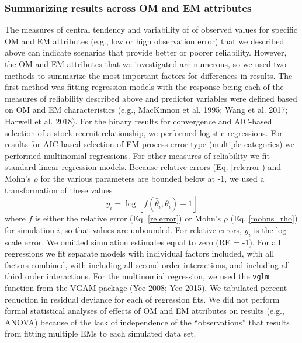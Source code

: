 \documentclass[
  12pt,
]{article}
\begin{document}
\subsubsection*{Summarizing results across OM and EM
attributes}\label{summarizing-results-across-om-and-em-attributes}

The measures of central tendency and variability of of observed values
for specific OM and EM attributes (e.g., low or high observation error)
that we described above can indicate scenarios that provide better or
poorer reliability. However, the OM and EM attributes that we
investigated are numerous, so we used two methods to summarize the most
important factors for differences in results. The first method was
fitting regression models with the response being each of the measures
of reliability described above and predictor variables were defined
based on OM and EM characteristics (e.g., MacKinnon et al. 1995; Wang et
al. 2017; Harwell et al. 2018). For the binary results for convergence
and AIC-based selection of a stock-recruit relationship, we performed
logistic regressions. For results for AIC-based selection of EM process
error type (multiple categories) we performed multinomial regressions.
For other measures of reliability we fit standard linear regression
models. Because relative errors (Eq. \ref{relerror}) and Mohn's \(\rho\)
for the various parameters are bounded below at -1, we used a
transformation of these values
\begin{equation}\label{bias_regression_response}
y_i = \log\left[f\left(\widehat \theta_i,\theta_i\right)+1\right]
\end{equation} where \(f\) is either the relative error (Eq.
\ref{relerror}) or Mohn's \(\rho\) (Eq. \ref{mohns_rho}) for simulation
\(i\), so that values are unbounded. For relative errors, \(y_i\) is the
log-scale error. We omitted simulation estimates equal to zero (RE =
-1). For all regressions we fit separate models with individual factors
included, with all factors combined, with including all second order
interactions, and including all third order interactions. For the
multinomial regression, we used the \verb|vglm| function from the VGAM
package (Yee 2008; Yee 2015). We tabulated percent reduction in residual
deviance for each of regression fits. We did not perform formal
statistical analyses of effects of OM and EM attributes on results
(e.g., ANOVA) because of the lack of independence of the
``observations'' that results from fitting multiple EMs to each
simulated data set.
\end{document}
